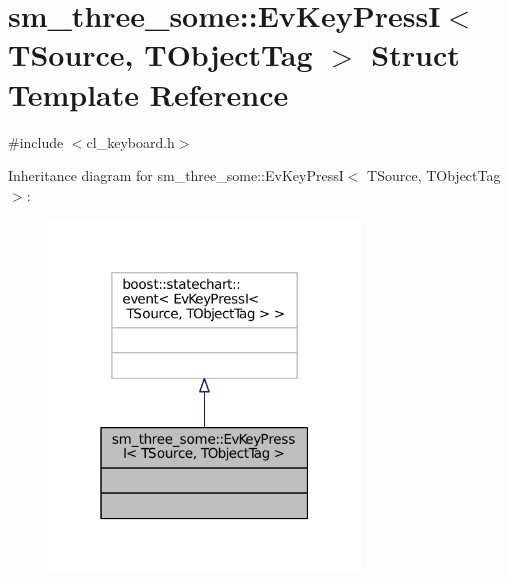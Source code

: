 \hypertarget{structsm__three__some_1_1EvKeyPressI}{}\section{sm\+\_\+three\+\_\+some\+:\+:Ev\+Key\+PressI$<$ T\+Source, T\+Object\+Tag $>$ Struct Template Reference}
\label{structsm__three__some_1_1EvKeyPressI}


{\ttfamily \#include $<$cl\+\_\+keyboard.\+h$>$}



Inheritance diagram for sm\+\_\+three\+\_\+some\+:\+:Ev\+Key\+PressI$<$ T\+Source, T\+Object\+Tag $>$\+:
\nopagebreak
\begin{figure}[H]
\begin{center}
\leavevmode
\includegraphics[width=235pt]{structsm__three__some_1_1EvKeyPressI__inherit__graph}
\end{center}
\end{figure}



